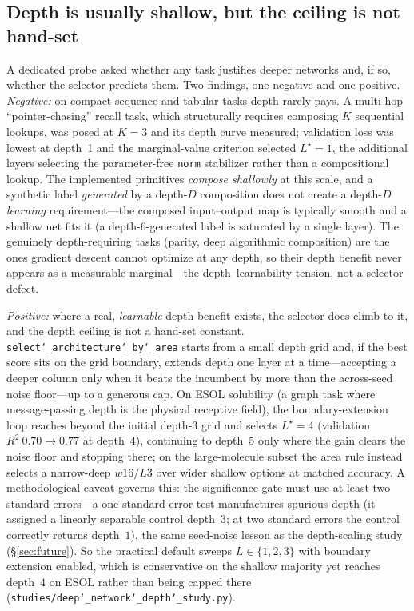 \documentclass[11pt]{article}
\newcommand{\allowbreakhere}{\discretionary{}{}{}}
\newcommand{\code}[1]{\texttt{\def\_{\char`_\allowbreakhere}#1}}
\begin{document}
\subsection{Depth is usually shallow, but the ceiling is not hand-set}
\label{sec:depthlimit}

A dedicated probe asked whether any task justifies deeper networks and, if so, whether the selector
predicts them. Two findings, one negative and one positive. \emph{Negative:} on compact sequence and
tabular tasks depth rarely pays. A multi-hop ``pointer-chasing'' recall task, which structurally
requires composing $K$ sequential lookups, was posed at $K=3$ and its depth curve measured; validation
loss was lowest at depth~1 and the marginal-value criterion selected $L^\star=1$, the additional layers
selecting the parameter-free \code{norm} stabilizer rather than a compositional lookup. The implemented
primitives \emph{compose shallowly} at this scale, and a synthetic label \emph{generated} by a depth-$D$
composition does not create a depth-$D$ \emph{learning} requirement---the composed input--output map is
typically smooth and a shallow net fits it (a depth-$6$-generated label is saturated by a single layer).
The genuinely depth-requiring tasks (parity, deep algorithmic composition) are the ones gradient descent
cannot optimize at any depth, so their depth benefit never appears as a measurable marginal---the
depth--learnability tension, not a selector defect.

\emph{Positive:} where a real, \emph{learnable} depth benefit exists, the selector does climb to it, and
the depth ceiling is not a hand-set constant. \code{select\_architecture\_by\_area} starts from a small
depth grid and, if the best score sits on the grid boundary, extends depth one layer at a time---accepting
a deeper column only when it beats the incumbent by more than the across-seed noise floor---up to a
generous cap. On ESOL solubility (a graph task where message-passing depth is the physical receptive
field), the boundary-extension loop reaches beyond the initial depth-$3$ grid and selects $L^\star=4$
(validation $R^2\ 0.70\to0.77$ at depth~$4$), continuing to depth~$5$ only where the gain clears the noise
floor and stopping there; on the
large-molecule subset the area rule instead selects a narrow-deep $w16/L3$ over wider shallow options at
matched accuracy. A methodological caveat governs this: the significance gate must use at least two
standard errors---a one-standard-error test manufactures spurious depth (it assigned a linearly separable
control depth~$3$; at two standard errors the control correctly returns depth~$1$), the same seed-noise
lesson as the depth-scaling study (\S\ref{sec:future}). So the practical default sweeps $L\in\{1,2,3\}$
with boundary extension enabled, which is conservative on the shallow majority yet reaches depth~$4$ on
ESOL rather than being capped there (\code{studies/deep\_network\_depth\_study.py}).
\end{document}
